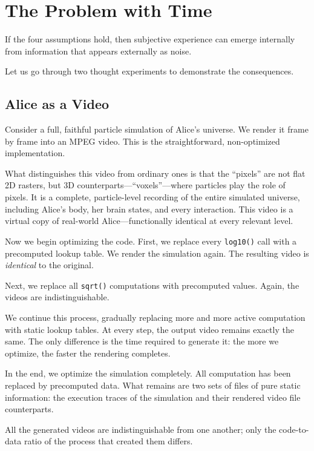 \chapter{The Problem with Time}
\label{chap:the-problem-with-time}

If the four assumptions hold, then subjective experience can emerge internally from information that appears externally as noise.

Let us go through two thought experiments to demonstrate the consequences.


\section{Alice as a Video}

Consider a full, faithful particle simulation of Alice's universe.
We render it frame by frame into an MPEG video.
This is the straightforward, non-optimized implementation.

What distinguishes this video from ordinary ones is that the ``pixels'' are not flat 2D rasters, but 3D counterparts---``voxels''---where particles play the role of pixels. 
It is a complete, particle-level recording of the entire simulated universe, including Alice's body, her brain states, and every interaction.
This video is a virtual copy of real-world Alice---functionally identical at every relevant level.

Now we begin optimizing the code.
First, we replace every \texttt{log10()} call with a precomputed lookup table.
We render the simulation again. The resulting video is \emph{identical} to the original.

Next, we replace all \texttt{sqrt()} computations with precomputed values.
Again, the videos are indistinguishable.

We continue this process, gradually replacing more and more active computation with static lookup tables.
At every step, the output video remains exactly the same.
The only difference is the time required to generate it: the more we optimize, the faster the rendering completes.

In the end, we optimize the simulation completely.
All computation has been replaced by precomputed data. What remains are two sets of files of pure static information: the execution traces of the simulation and their rendered video file counterparts.

All the generated videos are indistinguishable from one another; only the code-to-data ratio of the process that created them differs.

